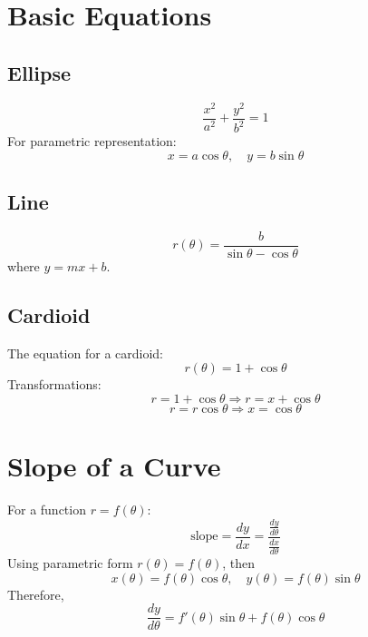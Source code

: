 \documentclass{report}
\begin{document}
\section{Basic Equations}

\subsection{Ellipse}
\[
	\frac{x^2}{a^2} + \frac{y^2}{b^2} = 1
\]
For parametric representation:
\[
	x = a \cos \theta, \quad y = b \sin \theta
\]

\subsection{Line}
\[
	r(\theta) = \frac{b}{\sin \theta - \cos \theta}
\]
where \( y = mx + b \).

\subsection{Cardioid}
The equation for a cardioid:
\[
	r(\theta) = 1 + \cos \theta
\]
Transformations:
\[
	r = 1 + \cos \theta \Rightarrow r = x + \cos \theta
\]
\[
	r = r \cos \theta \Rightarrow x = \cos \theta
\]

\section{Slope of a Curve}

For a function \( r = f(\theta) \):
\[
	\text{slope} = \frac{dy}{dx} = \frac{\frac{dy}{d\theta}}{\frac{dx}{d\theta}}
\]
Using parametric form \( r(\theta) = f(\theta) \), then
\[
	x(\theta) = f(\theta) \cos \theta, \quad y(\theta) = f(\theta) \sin \theta
\]
Therefore,
\[
	\frac{dy}{d\theta} = f'(\theta) \sin \theta + f(\theta) \cos \theta
\]

\end{document}
